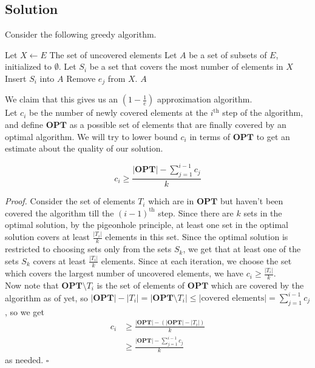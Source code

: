 \documentclass[a4paper]{article}
\newenvironment{proof}{\begin{breakbox}\textit{Proof.}}{\hfill$\square$\end{breakbox}}
\newcommand{\nl}{\vspace{0.2cm}\\}
\newcommand{\OPT}{\mathbf{OPT}}
\begin{document}
\subsection{Solution}

Consider the following greedy algorithm.
\begin{algorithmic}[1]
        \State Let $X \gets E$ \Comment The set of uncovered elements
        \State Let $A$ be a set of subsets of $E$, initialized to $\emptyset$.
            \State Let $S_i$ be a set that covers the most number of elements in $X$
            \State Insert $S_i$ into $A$
                    \State Remove $e_j$ from $X$.
                \EndIf
            \EndFor
        \EndFor
        \State \Return $A$
    \EndFunction
\end{algorithmic}
We claim that this gives us an $\left(1 - \frac{1}{e}\right)$ approximation algorithm.\nl
Let $c_i$ be the number of newly covered elements at the $i^\mathrm{th}$ step of the algorithm, and define $\OPT$ as a possible set of elements that are finally covered by an optimal algorithm.
We will try to lower bound $c_i$ in terms of $\OPT$ to get an estimate about the quality of our solution. \nl

\begin{claim}
    $$c_i \ge \frac{|\OPT| - \sum_{j = 1}^{i - 1} c_j}{k}$$
\end{claim}

\begin{proof}
Consider the set of elements $T_i$ which are in $\OPT$ but haven't been covered the algorithm till the $(i - 1)^\mathrm{th}$ step. Since there are $k$ sets in the optimal solution, by the pigeonhole
    principle, at least one set in the optimal solution covers at least $\frac{|T_i|}{k}$ elements in this set. Since the optimal solution is restricted to choosing sets only from the
    sets $S_k$, we get that at least one of the sets $S_k$ covers at least $\frac{|T_i|}{k}$ elements. Since at each iteration, we choose the set which covers the largest number of
uncovered elements, we have $c_i \ge \frac{|T_i|}{k}$.\nl
Now note that $\OPT \setminus T_i$ is the set of elements of $\OPT$ which are covered by the algorithm as of yet, so $|\OPT| - |T_i| = |\OPT \setminus T_i| \le |\text{covered elements}| = \sum_{j =
1}^{i - 1} c_j$, so we get
\begin{align*}
    c_i &\ge \frac{|\OPT| - (|\OPT| - |T_i|)}{k}\\
        &\ge \frac{|\OPT| - \sum_{j = 1}^{i - 1} c_j}{k}
\end{align*}
as needed.
\end{proof}
\end{document}
